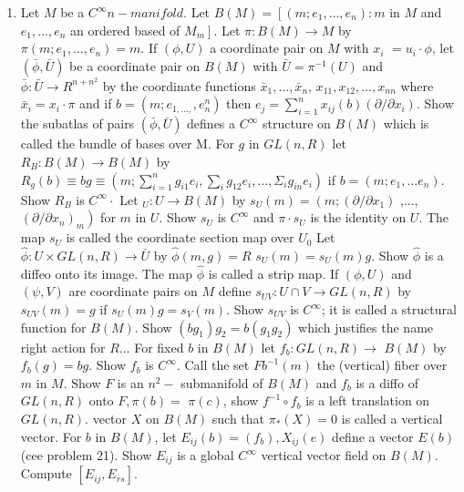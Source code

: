 \documentclass[10pt]{article}
\begin{document}
\begin{enumerate}
  \item Let $M$ be a $C^{\infty} n-m a n i f o l d .$ Let $B(M)=\left[\left(m ; e_{1}, \ldots, e_{n}\right): m\right.$ in $M$ and $e_{1}, \ldots, e_{n}$ an ordered based of $\left.M_{m}\right]$. Let $\pi: B(M) \rightarrow M$ by $\pi\left(m ; e_{1}, \ldots, e_{n}\right)=m .$ If $(\phi, U)$ a coordinate pair on $M$ with $x_{i}$ $=u_{i} \cdot \phi$, let $(\bar{\phi}, \bar{U})$ be a coordinate pair on $B(M)$ with $\bar{U}=\pi^{-1}(U)$ and $\bar{\phi}: \bar{U} \rightarrow R^{n+n^{2}}$ by the coordinate functions $\bar{x}_{1}, \ldots, \bar{x}_{n}$, $x_{11}, x_{12}, \ldots, x_{n n}$ where $\bar{x}_{i}=x_{i} \cdot \pi$ and if $b=\left(m ; e_{1, \ldots,}, e_{n}^{n}\right)$ then $e_{j}=\sum_{i=1}^{n} x_{i j}(b)\left(\partial / \partial x_{i}\right)$. Show the subatlas of pairs $(\bar{\phi}, \bar{U})$ defines a $C^{\infty}$ structure on $B(M)$ which is called the bundle of bases over M. For $g$ in $G L(n, R)$ let $R_{B}: B(M) \rightarrow B(M)$ by $R_{g}(b) \equiv b g \equiv\left(m ; \sum_{i=1}^{n} g_{i 1} e_{i}, \sum_{i} g_{12} e_{i}, \ldots, \Sigma_{i} g_{i n} e_{i}\right)$ if $b=\left(m ; e_{1}, \ldots e_{n}\right)$. Show $R_{B}$ is $C^{\infty} \cdot$ Let $_{U}: U \rightarrow B(M)$ by $s_{U}(m)=\left(m ;\left(\partial / \partial x_{1}\right)\right.$ ,..., $\left.\left(\partial / \partial x_{n}\right)_{m}\right)$ for $m$ in $U$. Show $s_{U}$ is $C^{\infty}$ and $\pi \cdot s_{U}$ is the identity on $U$. The map $s_{U}$ is called the coordinate section map over $U_{0}$ Let $\hat{\phi}: U \times G L(n, R) \rightarrow \bar{U}$ by $\hat{\phi}(m, g)=R$ $s_{U}(m)=s_{U}(m) g .$ Show $\hat{\phi}$ is a diffeo onto its image. The map $\hat{\phi}$ is called a strip map. If $(\phi, U)$ and $(\psi, V)$ are coordinate pairs on $M$ define $s_{U V}: U \cap V \rightarrow G L(n, R)$ by $s_{U V}(m)=g$ if $s_{U}(m) g=s_{V}(m)$. Show $s_{U V}$ is $C^{\infty}$; it is called a structural function for $B(M)$. Show $\left(b g_{1}\right) g_{2}=b\left(g_{1} g_{2}\right)$ which justifies the name right action for $R \ldots$ For fixed $b$ in $B(M)$ let $f_{b}: G L(n, R) \rightarrow$ $B(M)$ by $f_{b}(g)=b g .$ Show $f_{b}$ is $C^{\infty} .$ Call the set $F b^{-1}(m)$ the (vertical) fiber over $m$ in $M$. Show $F$ is an $n^{2}-$ submanifold of $B(M)$ and $f_{b}$ is a diffo of $G L(n, R)$ onto $F, \pi(b)=$ $\pi(c)$, show $f^{-1} \circ f_{b}$ is a left translation on $G L(n, R)$. vector $X$ on $B(M)$ such that $\pi_{*}(X)=0$ is called a vertical vector. For $b$ in $B(M)$, let $E_{i j}(b)=\left(f_{b}\right), X_{i j}(e)$ define a vector $E(b)$ (cee problem 21). Show $E_{i j}$ is a global $C^{\infty}$ vertical vector field on $B(M)$. Compute $\left[E_{i j}, E_{r s}\right]$.

\end{enumerate}
\end{document}
